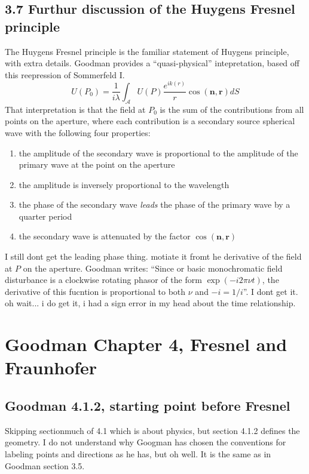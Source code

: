 \documentclass[../../main.tex]{subfiles}
\begin{document}
\subsection{3.7 Furthur discussion of the Huygens Fresnel principle}
The Huygens Fresnel principle is the familiar statement of Huygens principle, with extra details. Goodman provides a ``quasi-physical'' intepretation, based off this reepression of Sommerfeld I.
\begin{equation}
    U(P_0)=\frac{1}{i\lambda}\int_{\mathcal{A}}U(P)\frac{e^{ik(r)}}{r}\cos(\mathbf{n},\mathbf{r}) dS
\end{equation}
That interpretation is that the field at $P_0$ is the sum of the contributions from all points on the aperture, where each contribution is a secondary source spherical wave with the following four properties:
\begin{enumerate}
    \item the amplitude of the secondary wave is proportional to the amplitude of the primary wave at the point on the aperture
    \item the amplitude is inversely proportional to the wavelength
    \item the phase of the secondary wave \textit{leads} the phase of the primary wave by a quarter period
    \item the secondary wave is attenuated by the factor $\cos(\mathbf{n},\mathbf{r})$ 
\end{enumerate}
I still dont get the leading phase thing. motiate it fromt he derivative of the field at $P$ on the aperture. Goodman writes: ``Since or basic monochromatic field disturbance is a clockwise rotating phasor of the form $\exp(-i2\pi\nu t)$, the derivative of this fucntion is proportional to both $\nu$ and $-i=1/i$''. I dont get it. oh wait... i do get it, i had a sign error in my head about the time relationship. 



\section{Goodman Chapter 4, Fresnel and Fraunhofer}

\subsection{Goodman 4.1.2, starting point before Fresnel}
Skipping sectionmuch of 4.1 which is about physics, but section 4.1.2 defines the geometry. I do not understand why Googman has chosen the conventions for labeling points and directions as he has, but oh well. It is the same as in Goodman section 3.5. 
\end{document}
